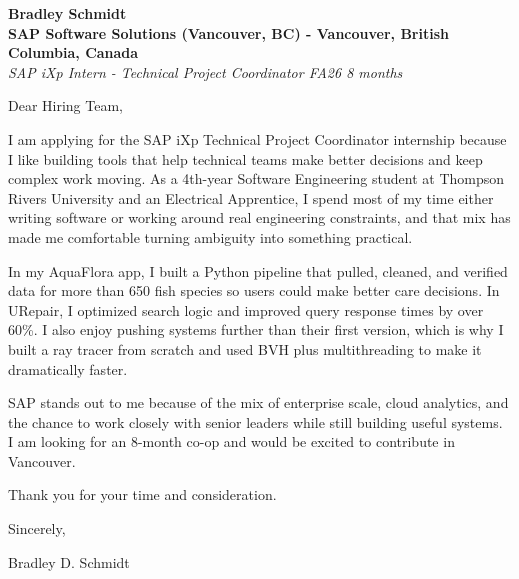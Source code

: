 \documentclass[11pt]{article}
\begin{document}
\textbf{Bradley Schmidt}\\
\vspace{0.5em}
\textbf{SAP Software Solutions (Vancouver, BC) - Vancouver, British Columbia, Canada}\\
\textit{SAP iXp Intern - Technical Project Coordinator FA26 8 months}

Dear Hiring Team,

\par

I am applying for the SAP iXp Technical Project Coordinator internship because I like building tools that help technical teams make better decisions and keep complex work moving. As a 4th-year Software Engineering student at Thompson Rivers University and an Electrical Apprentice, I spend most of my time either writing software or working around real engineering constraints, and that mix has made me comfortable turning ambiguity into something practical.

\par

In my AquaFlora app, I built a Python pipeline that pulled, cleaned, and verified data for more than 650 fish species so users could make better care decisions. In URepair, I optimized search logic and improved query response times by over 60\%. I also enjoy pushing systems further than their first version, which is why I built a ray tracer from scratch and used BVH plus multithreading to make it dramatically faster.

\par

SAP stands out to me because of the mix of enterprise scale, cloud analytics, and the chance to work closely with senior leaders while still building useful systems. I am looking for an 8-month co-op and would be excited to contribute in Vancouver.

\par

Thank you for your time and consideration.

\par

Sincerely,

\par

Bradley D. Schmidt
\end{document}
